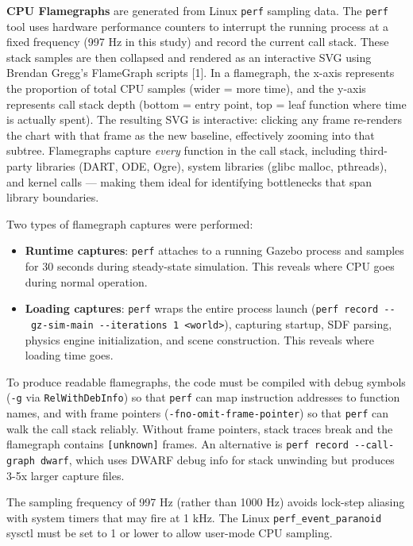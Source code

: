 \documentclass[11pt, a4paper]{article}
\providecommand{\tightlist}{%
  \setlength{\itemsep}{0pt}\setlength{\parskip}{0pt}}
\begin{document}
\textbf{CPU Flamegraphs} are generated from Linux \texttt{perf} sampling
data. The \texttt{perf} tool uses hardware performance counters to
interrupt the running process at a fixed frequency (997 Hz in this
study) and record the current call stack. These stack samples are then
collapsed and rendered as an interactive SVG using Brendan Gregg's
FlameGraph scripts {[}1{]}. In a flamegraph, the x-axis represents the
proportion of total CPU samples (wider = more time), and the y-axis
represents call stack depth (bottom = entry point, top = leaf function
where time is actually spent). The resulting SVG is interactive:
clicking any frame re-renders the chart with that frame as the new
baseline, effectively zooming into that subtree. Flamegraphs capture
\emph{every} function in the call stack, including third-party libraries
(DART, ODE, Ogre), system libraries (glibc malloc, pthreads), and kernel
calls --- making them ideal for identifying bottlenecks that span
library boundaries.

Two types of flamegraph captures were performed:

\begin{itemize}
\tightlist
\item
  \textbf{Runtime captures}: \texttt{perf} attaches to a running Gazebo
  process and samples for 30 seconds during steady-state simulation.
  This reveals where CPU goes during normal operation.
\item
  \textbf{Loading captures}: \texttt{perf} wraps the entire process
  launch
  (\texttt{perf\ record\ -\/-\ gz-sim-main\ -\/-iterations\ 1\ \textless{}world\textgreater{}}),
  capturing startup, SDF parsing, physics engine initialization, and
  scene construction. This reveals where loading time goes.
\end{itemize}

To produce readable flamegraphs, the code must be compiled with debug
symbols (\texttt{-g} via \texttt{RelWithDebInfo}) so that \texttt{perf}
can map instruction addresses to function names, and with frame pointers
(\texttt{-fno-omit-frame-pointer}) so that \texttt{perf} can walk the
call stack reliably. Without frame pointers, stack traces break and the
flamegraph contains \texttt{{[}unknown{]}} frames. An alternative is
\texttt{perf\ record\ -\/-call-graph\ dwarf}, which uses DWARF debug
info for stack unwinding but produces 3-5x larger capture files.

The sampling frequency of 997 Hz (rather than 1000 Hz) avoids lock-step
aliasing with system timers that may fire at 1 kHz. The Linux
\texttt{perf\_event\_paranoid} sysctl must be set to 1 or lower to allow
user-mode CPU sampling.
\end{document}
